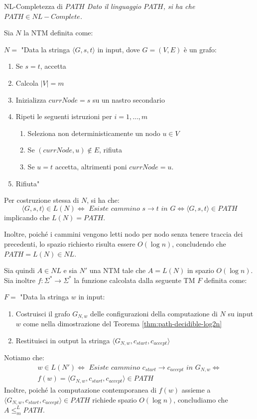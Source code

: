 \begin{Thm}{NL-Completezza di $PATH$}{}
\textit{Dato il linguaggio $PATH$, si ha che $PATH\in NL-Complete$.}
\begin{demonstration}
Sia $N$ la NTM definita come:

$N =$ "Data la stringa $\langle G, s, t\rangle$ in input, dove $G = (V, E)$ è un grafo:
\begin{enumerate}
    \item Se $s = t$, accetta
    \item Calcola $|V| = m$
    \item Inizializza $currNode = s$ su un nastro secondario
    \item Ripeti le seguenti istruzioni per $i = 1, ..., m$
    \begin{enumerate}
        \item Seleziona non deterministicamente un nodo $u\in V$
        \item Se $(currNode, u)\notin E$, rifiuta
        \item Se $u = t$ accetta, altrimenti poni $currNode = u$.
    \end{enumerate}
    \item Rifiuta"
\end{enumerate}
Per costruzione stessa di $N$, si ha che:
\begin{equation*}
\langle G, s, t\rangle\in L(N)\iff\textit{ Esiste cammino }s\to t\textit{ in }G\iff \langle G, s, t\rangle \in PATH
\end{equation*}
implicando che $L(N) = PATH$.

Inoltre, poiché i cammini vengono letti nodo per nodo senza tenere traccia dei precedenti, lo spazio richiesto risulta essere $O(\log n)$, concludendo che $PATH = L(N)\in NL$.

Sia quindi $A \in NL$ e sia $N'$ una NTM tale che $A = L(N)$ in spazio $O(\log n)$.
Sia inoltre $f : \Sigma^*\to \Sigma^*$ la funzione calcolata dalla seguente TM $F$ definita come:

$F =$ "Data la stringa $w$ in input:
\begin{enumerate}
    \item Costruisci il grafo $G_{N,w}$ delle configurazioni della computazione di $N$ su input $w$ come nella dimostrazione del Teorema \ref{thm:path-decidible-log2n}
    \item Restituisci in output la stringa $\langle G_{N,w}, c_{start}, c_{accept}\rangle$
\end{enumerate}
Notiamo che:
\begin{align*}
w \in L(N')\iff\textit{ Esiste cammino }c_{start}\to c_{accept}\textit{ in }G_{N,w}\iff\\ f(w) = \langle G_{N,w}, c_{start}, c_{accept}\rangle\in PATH
\end{align*}
Inoltre, poiché la computazione contemporanea di $f(w)$ assieme a $\langle G_{N,w}, c_{start}, c_{accept}\rangle \in
PATH$ richiede spazio $O(\log n)$, concludiamo che $A\leq^L_m PATH$.
\end{demonstration}
\end{Thm}


